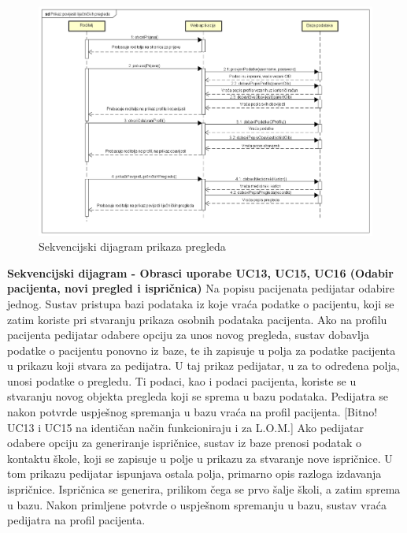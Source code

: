 					\begin{figure}[H]
						\includegraphics[scale=0.4]{dijagrami/rodseq1.PNG} %
						\centering
						\caption{Sekvencijski dijagram prikaza pregleda}
						\label{fig:seq1}
					\end{figure}
					\clearpage
				\textbf{Sekvencijski dijagram - Obrasci uporabe UC13, UC15, UC16 (Odabir pacijenta, novi pregled i ispričnica)}\newline
				\text Na popisu pacijenata pedijatar odabire jednog. Sustav pristupa bazi podataka iz koje vraća podatke o pacijentu, koji se zatim koriste pri stvaranju prikaza osobnih podataka pacijenta. Ako na profilu pacijenta pedijatar odabere opciju za unos novog pregleda, sustav dobavlja podatke o pacijentu ponovno iz baze, te ih zapisuje u polja za podatke pacijenta u prikazu koji stvara za pedijatra. U taj prikaz pedijatar, u za to određena polja, unosi podatke o pregledu. Ti podaci, kao i podaci pacijenta, koriste se u stvaranju novog objekta pregleda koji se sprema u bazu podataka. Pedijatra se nakon potvrde uspješnog spremanja u bazu vraća na profil pacijenta. [Bitno! UC13 i UC15 na identičan način funkcioniraju i za L.O.M.] Ako pedijatar odabere opciju za generiranje ispričnice, sustav iz baze prenosi podatak o kontaktu škole, koji se zapisuje u polje u prikazu za stvaranje nove ispričnice. U tom prikazu pedijatar ispunjava ostala polja, primarno opis razloga izdavanja ispričnice. Ispričnica se generira, prilikom čega se prvo šalje školi, a zatim sprema u bazu. Nakon primljene potvrde o uspješnom spremanju u bazu, sustav vraća pedijatra na profil pacijenta.
				
